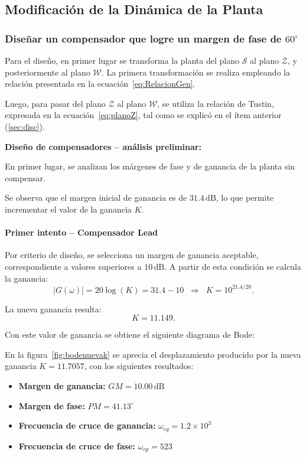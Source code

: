 \subsection{Modificación de la Dinámica de la Planta}
\subsubsection{Diseñar un compensador que logre un margen de fase de $60^\circ$} 

Para el diseño, en primer lugar se transforma la planta del plano $\mathcal{S}$ al plano $\mathcal{Z}$, y posteriormente al plano $\mathcal{W}$. La primera transformación se realiza empleando la relación presentada en la ecuación~\ref{eq:RelacionGen}.  

Luego, para pasar del plano $\mathcal{Z}$ al plano $\mathcal{W}$, se utiliza la relación de Tustin, expresada en la ecuación~\ref{eq:planoZ}, tal como se explicó en el ítem anterior (\ref{sec:disc}).

\textbf{Diseño de compensadores – análisis preliminar:}  

En primer lugar, se analizan los márgenes de fase y de ganancia de la planta sin compensar.


Se observa que el margen inicial de ganancia es de $31.4\,\text{dB}$, lo que permite incrementar el valor de la ganancia $K$.  

\paragraph{Primer intento – Compensador Lead}  

Por criterio de diseño, se selecciona un margen de ganancia aceptable, correspondiente a valores superiores a $10\,\text{dB}$. A partir de esta condición se calcula la ganancia:
\[
|G(\omega)| = 20 \log(K) = 31.4 - 10 
\;\;\Rightarrow\;\; K = 10^{21.4/20}.
\]

La nueva ganancia resulta:
\[
K = 11.149.
\]

Con este valor de ganancia se obtiene el siguiente diagrama de Bode:


En la figura~\ref{fig:bodenuevak} se aprecia el desplazamiento producido por la nueva ganancia $K = 11.7057$, con los siguientes resultados:
\begin{itemize}
	\item \textbf{Margen de ganancia:} $GM = 10.00\,\text{dB}$
	\item \textbf{Margen de fase:} $PM = 41.13^\circ$
	\item \textbf{Frecuencia de cruce de ganancia:} $\omega_{cg} = 1.2 \times 10^3$
	\item \textbf{Frecuencia de cruce de fase:} $\omega_{cp} = 523$
\end{itemize}

